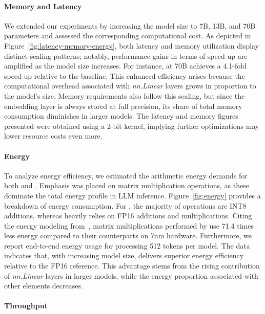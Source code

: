 \paragraph{Memory and Latency}

We extended our experiments by increasing the model size to 7B, 13B, and 70B parameters and assessed the corresponding computational cost. As depicted in Figure~\ref{fig:latency-memory-energy}, both latency and memory utilization display distinct scaling patterns; notably, performance gains in terms of speed-up are amplified as the model size increases. For instance,  at 70B achieves a 4.1-fold speed-up relative to the  baseline. This enhanced efficiency arises because the computational overhead associated with \emph{nn.Linear} layers grows in proportion to the model's size. Memory requirements also follow this scaling, but since the embedding layer is always stored at full precision, its share of total memory consumption diminishes in larger models. The latency and memory figures presented were obtained using a 2-bit kernel, implying further optimizations may lower resource costs even more.

\paragraph{Energy}

To analyze energy efficiency, we estimated the arithmetic energy demands for both  and . Emphasis was placed on matrix multiplication operations, as these dominate the total energy profile in LLM inference. Figure~\ref{fig:energy} provides a breakdown of energy consumption. For , the majority of operations are INT8 additions, whereas  heavily relies on FP16 additions and multiplications. Citing the energy modeling from~\cite{energycost, pokebnn}, matrix multiplications performed by  use 71.4 times less energy compared to their counterparts on 7nm hardware. Furthermore, we report end-to-end energy usage for processing 512 tokens per model. The data indicates that, with increasing model size,  delivers superior energy efficiency relative to the FP16  reference. This advantage stems from the rising contribution of \emph{nn.Linear} layers in larger models, while the energy proportion associated with other elements decreases.

\paragraph{Throughput}


